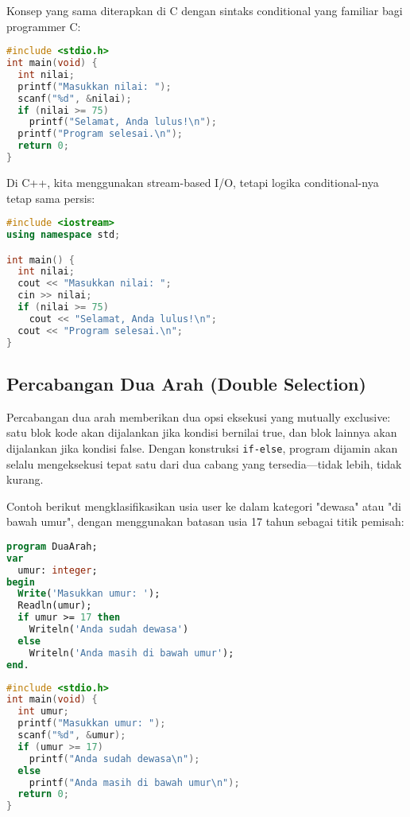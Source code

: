 \documentclass[../main.tex]{subfiles}
\begin{document}
Konsep yang sama diterapkan di C dengan sintaks conditional yang familiar bagi programmer C:

\begin{lstlisting}[language=C, caption={Percabangan satu arah di C}]
#include <stdio.h>
int main(void) {
  int nilai;
  printf("Masukkan nilai: ");
  scanf("%d", &nilai);
  if (nilai >= 75)
    printf("Selamat, Anda lulus!\n");
  printf("Program selesai.\n");
  return 0;
}
\end{lstlisting}

Di C++, kita menggunakan stream-based I/O, tetapi logika conditional-nya tetap sama persis:

\begin{lstlisting}[language=C++, caption={Percabangan satu arah di C++}]
#include <iostream>
using namespace std;

int main() {
  int nilai;
  cout << "Masukkan nilai: ";
  cin >> nilai;
  if (nilai >= 75)
    cout << "Selamat, Anda lulus!\n";
  cout << "Program selesai.\n";
}
\end{lstlisting}

\subsection{Percabangan Dua Arah (Double Selection)}
Percabangan dua arah memberikan dua opsi eksekusi yang mutually exclusive: satu blok kode akan dijalankan jika kondisi bernilai true, dan blok lainnya akan dijalankan jika kondisi false. Dengan konstruksi \texttt{if-else}, program dijamin akan selalu mengeksekusi tepat satu dari dua cabang yang tersedia—tidak lebih, tidak kurang.

Contoh berikut mengklasifikasikan usia user ke dalam kategori "dewasa" atau "di bawah umur", dengan menggunakan batasan usia 17 tahun sebagai titik pemisah:

\begin{lstlisting}[language=Pascal, caption={Percabangan dua arah di Pascal}]
program DuaArah;
var
  umur: integer;
begin
  Write('Masukkan umur: ');
  Readln(umur);
  if umur >= 17 then
    Writeln('Anda sudah dewasa')
  else
    Writeln('Anda masih di bawah umur');
end.
\end{lstlisting}

\begin{lstlisting}[language=C, caption={Percabangan dua arah di C}]
#include <stdio.h>
int main(void) {
  int umur;
  printf("Masukkan umur: ");
  scanf("%d", &umur);
  if (umur >= 17)
    printf("Anda sudah dewasa\n");
  else
    printf("Anda masih di bawah umur\n");
  return 0;
}
\end{lstlisting}
\end{document}
